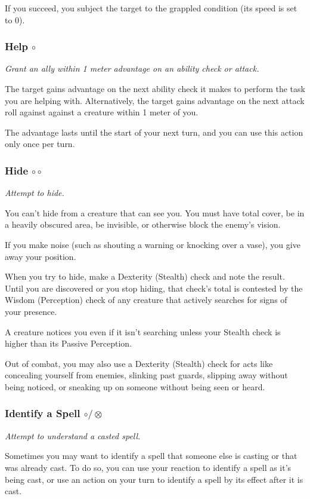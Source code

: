     If you succeed, you subject the target to the grappled condition (its speed is set to 0).
\subsubsection{Help $\circ$} \label{act::help}
    \textit{Grant an ally within 1 meter advantage on an ability check or attack.}

    The target gains advantage on the next ability check it makes to perform the task you are helping with.
    Alternatively, the target gains advantage on the next attack roll against against a creature within 1 meter of you.

    The advantage lasts until the start of your next turn, and you can use this action only once per turn.
\subsubsection{Hide $\circ\circ$} \label{act::hide}
    \textit{Attempt to hide.}

    You can't hide from a creature that can see you.
    You must have total cover, be in a heavily obscured area, be invisible, or otherwise block the enemy's vision.

    If you make noise (such as shouting a warning or knocking over a vase), you give away your position.

    When you try to hide, make a Dexterity (Stealth) check and note the result.
    Until you are discovered or you stop hiding, that check's total is contested by the Wisdom (Perception) check of any creature that actively searches for signs of your presence.

    A creature notices you even if it isn't searching unless your Stealth check is higher than its Passive Perception.

    Out of combat, you may also use a Dexterity (Stealth) check for acts like concealing yourself from enemies, slinking past guards, slipping away without being noticed, or sneaking up on someone without being seen or heard.
\subsubsection{Identify a Spell $\circ/\otimes$} \label{act::identifyaspell}
    \textit{Attempt to understand a casted spell.}

    Sometimes you may want to identify a spell that someone else is casting or that was already cast.
    To do so, you can use your reaction to identify a spell as it's being cast, or use an action on your turn to identify a spell by its effect after it is cast.

